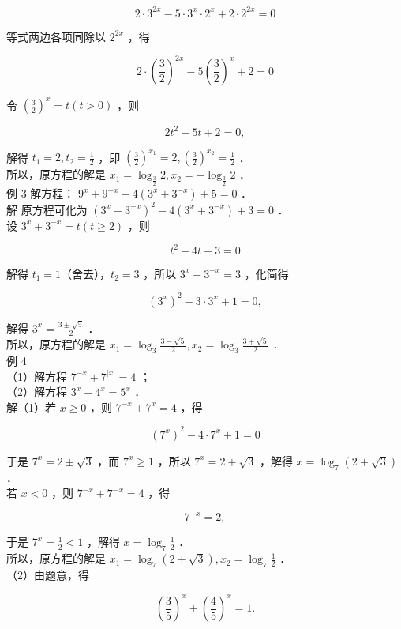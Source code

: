 \documentclass[10pt]{article}
\begin{document}
\[
2 \cdot 3^{2 x}-5 \cdot 3^{x} \cdot 2^{x}+2 \cdot 2^{2 x}=0
\]

等式两边各项同除以 \(2^{2 x}\) ，得

\[
2 \cdot\left(\frac{3}{2}\right)^{2 x}-5\left(\frac{3}{2}\right)^{x}+2=0
\]

令 \(\left(\frac{3}{2}\right)^{x}=t(t>0)\) ，则

\[
2 t^{2}-5 t+2=0,
\]

解得 \(t_{1}=2, t_{2}=\frac{1}{2}\) ，即 \(\left(\frac{3}{2}\right)^{x_{1}}=2,\left(\frac{3}{2}\right)^{x_{2}}=\frac{1}{2}\) ．\\
所以，原方程的解是 \(x_{1}=\log _{\frac{3}{2}} 2, x_{2}=-\log _{\frac{3}{2}} 2\) ．\\
例 3 解方程： \(9^{x}+9^{-x}-4\left(3^{x}+3^{-x}\right)+5=0\) ．\\
解 原方程可化为 \(\left(3^{x}+3^{-x}\right)^{2}-4\left(3^{x}+3^{-x}\right)+3=0\) ．\\
设 \(3^{x}+3^{-x}=t(t \geqslant 2)\) ，则

\[
t^{2}-4 t+3=0
\]

解得 \(t_{1}=1\)（舍去），\(t_{2}=3\) ，所以 \(3^{x}+3^{-x}=3\) ，化简得

\[
\left(3^{x}\right)^{2}-3 \cdot 3^{x}+1=0,
\]

解得 \(3^{x}=\frac{3 \pm \sqrt{5}}{2}\) ．\\
所以，原方程的解是 \(x_{1}=\log _{3} \frac{3-\sqrt{5}}{2}, x_{2}=\log _{3} \frac{3+\sqrt{5}}{2}\) ．\\
例 4\\
（1）解方程 \(7^{-x}+7^{|x|}=4\) ；\\
（2）解方程 \(3^{x}+4^{x}=5^{x}\) ．\\
解（1）若 \(x \geqslant 0\) ，则 \(7^{-x}+7^{x}=4\) ，得

\[
\left(7^{x}\right)^{2}-4 \cdot 7^{x}+1=0
\]

于是 \(7^{x}=2 \pm \sqrt{3}\) ，而 \(7^{x} \geqslant 1\) ，所以 \(7^{x}=2+\sqrt{3}\) ，解得 \(x=\log _{7}(2+\sqrt{3})\) ．\\
若 \(x<0\) ，则 \(7^{-x}+7^{-x}=4\) ，得

\[
7^{-x}=2,
\]

于是 \(7^{x}=\frac{1}{2}<1\) ，解得 \(x=\log _{7} \frac{1}{2}\) ．\\
所以，原方程的解是 \(x_{1}=\log _{7}(2+\sqrt{3}), x_{2}=\log _{7} \frac{1}{2}\) ．\\
（2）由题意，得

\[
\left(\frac{3}{5}\right)^{x}+\left(\frac{4}{5}\right)^{x}=1 .
\]
\end{document}
